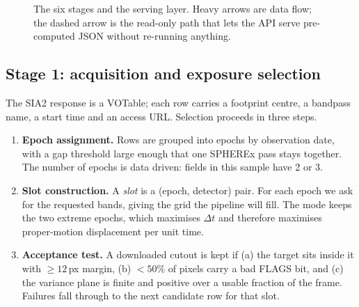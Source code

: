 \documentclass[11pt,a4paper]{article}
\newcommand{\code}[1]{\texttt{\small\detokenize{#1}}}
\begin{document}
\begin{figure}[H]
{}
\caption{The six stages and the serving layer. Heavy arrows are data flow; the dashed arrow is the
read-only path that lets the API serve pre-computed JSON without re-running anything.}
\label{fig:architecture}
\end{figure}

\subsection{Stage 1: acquisition and exposure selection}
\label{sec:ingest}

The SIA2 response is a VOTable; each row carries a footprint centre, a bandpass name, a start time
and an access URL. Selection proceeds in three steps.

\begin{enumerate}[leftmargin=1.4em,itemsep=2pt]
\item \textbf{Epoch assignment.} Rows are grouped into epochs by observation date, with a gap
      threshold large enough that one SPHEREx pass stays together. The number of epochs is data
      driven: fields in this sample have 2 or 3.
\item \textbf{Slot construction.} A \emph{slot} is a (epoch, detector) pair. For each epoch we ask
      for the requested bands, giving the grid the pipeline will fill. The mode
      \code{--epochs firstlast} keeps the two extreme epochs, which maximises $\Delta t$ and therefore
      maximises proper-motion displacement per unit time.
\item \textbf{Acceptance test.} A downloaded cutout is kept if (a) the target sits inside it with
      $\ge 12$\,px margin, (b) $<50\%$ of pixels carry a bad FLAGS bit, and (c) the variance plane is
      finite and positive over a usable fraction of the frame. Failures fall through to the next
      candidate row for that slot.
\end{enumerate}
\end{document}
